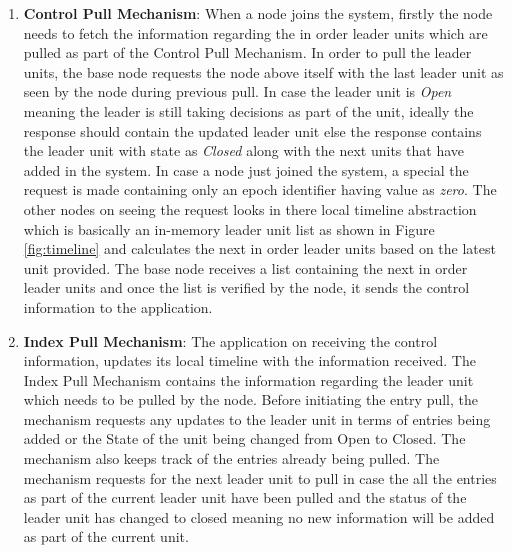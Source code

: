 \documentclass[12pt,a4paper,twoside,openright]{book}
\begin{document}
\begin{enumerate}

\item \textbf{Control Pull Mechanism}: When a node joins the system, firstly the node needs to fetch the information regarding the in order leader units which are pulled as part of the Control Pull Mechanism. In order to pull the leader units, the base node requests the node above itself with the last leader unit as seen by the node during previous pull. In case the leader unit is \textit{Open} meaning the leader is still taking decisions as part of the unit, ideally the response should contain the updated leader unit else the response contains the leader unit with state as \textit{Closed} along with the next units that have added in the system. In case a node just joined the system, a special the request is made containing only an epoch identifier having value as \textit{zero}. The other nodes on seeing the request looks in there local timeline abstraction which is basically an in-memory leader unit list as shown in Figure \ref{fig:timeline} and calculates the next in order leader units based on the latest unit provided. The base node receives a list containing the next in order leader units and once the list is verified by the node, it sends the control information to the application.

\item \textbf{Index Pull Mechanism}: The application on receiving the control information, updates its local timeline with the information received. The Index Pull Mechanism contains the information regarding the leader unit which needs to be pulled by the node. Before initiating the entry pull, the mechanism requests any updates to the leader unit in terms of entries being added or the State of the unit being changed from Open to Closed. The mechanism also keeps track of the entries already being pulled. The mechanism requests for the next leader unit to pull in case the all the entries as part of the current leader unit have been pulled and the status of the leader unit has changed to closed meaning no new information will be added as part of the current unit.

\end{enumerate}
\end{document}
